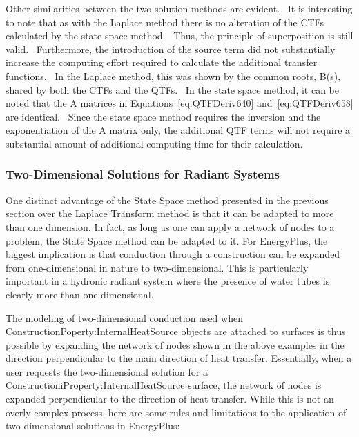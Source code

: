 Other similarities between the two solution methods are evident.~ It is interesting to note that as with the Laplace method there is no alteration of the CTFs calculated by the state space method.~ Thus, the principle of superposition is still valid.~ Furthermore, the introduction of the source term did not substantially increase the computing effort required to calculate the additional transfer functions.~ In the Laplace method, this was shown by the common roots, B(s), shared by both the CTFs and the QTFs.~ In the state space method, it can be noted that the A matrices in Equations~\ref{eq:QTFDeriv640} and~\ref{eq:QTFDeriv658} are identical.~ Since the state space method requires the inversion and the exponentiation of the A matrix only, the additional QTF terms will not require a substantial amount of additional computing time for their calculation.

\subsubsection{Two-Dimensional Solutions for Radiant Systems}\label{two-dimensional-solutions-for-radiant-systems}

One distinct advantage of the State Space method presented in the previous section over the Laplace Transform method is that it can be adapted to more than one dimension.  In fact, as long as one can apply a network of nodes to a problem, the State Space method can be adapted to it.  For EnergyPlus, the biggest implication is that conduction through a construction can be expanded from one-dimensional in nature to two-dimensional.  This is particularly important in a hydronic radiant system where the presence of water tubes is clearly more than one-dimensional.

The modeling of two-dimensional conduction used when
ConstructionPoperty:InternalHeatSource objects are attached to surfaces is thus
possible by expanding the network of nodes shown in the above examples in the
direction perpendicular to the main direction of heat transfer.  Essentially,
when a user requests the two-dimensional solution for a
ConstructioniProperty:InternalHeatSource surface, the network of nodes is
expanded perpendicular to the direction of heat transfer.  While this is not
an overly complex process, here are some rules and limitations to the
application of two-dimensional solutions in EnergyPlus:

